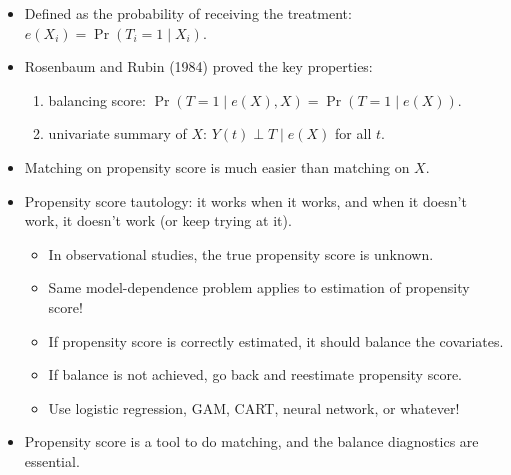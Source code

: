 \documentclass[20pt,landscape,pdftex]{foils}
\begin{document}
\begin{itemize}
\item Defined as the probability of receiving the treatment: 
 $e(X_i)=\Pr(T_i=1\mid X_i)$.\pause
  
\item Rosenbaum and Rubin (1984) proved the key properties:\pause
  \begin{enumerate}
  \item balancing score: $\Pr(T = 1 \mid e(X), X) = \Pr(T = 1
    \mid e(X))$.\pause 
  \item univariate summary of $X$: $Y(t) \perp T \mid e(X)$
    for all $t$.\pause
  \end{enumerate}

\item Matching on propensity score is much easier than matching on $X$.\pause 

\item Propensity score tautology: it works when it works, and when
  it doesn't work, it doesn't work (or keep trying at it).\pause
  
  \begin{itemize}
  \item In observational studies, the true propensity score is
    unknown.\pause
  \item Same model-dependence problem applies to estimation of
    propensity score!\pause
  \item If propensity score is correctly estimated, it should balance
    the covariates.\pause
  \item If balance is not achieved, go back and reestimate propensity
    score.\pause
  \item Use logistic regression, GAM, CART, neural network, or whatever!\pause
  \end{itemize}

\item Propensity score is a tool to do matching, and the balance
  diagnostics are essential.\pause


\end{itemize}



\hypersetup{pdfpagetransition=Replace}
\end{document}
